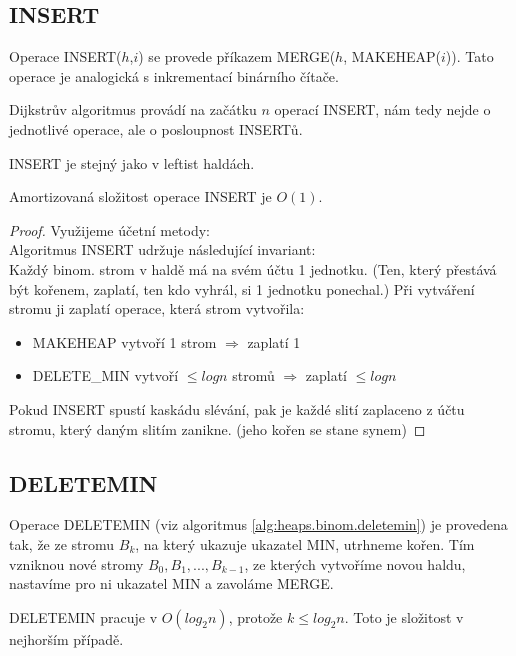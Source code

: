\subsection{INSERT}

Operace INSERT($h$,$i$) se provede příkazem MERGE($h$, MAKEHEAP($i$)).
Tato operace je analogická s inkrementací binárního čítače.

Dijkstrův algoritmus provádí na začátku $n$ operací INSERT, nám tedy nejde
o jednotlivé operace, ale o posloupnost INSERTů.

\begin{pozn}
INSERT je stejný jako v leftist haldách.
\end{pozn}

\begin{theorem}
Amortizovaná složitost operace INSERT je $O(1)$.
\end{theorem}

\begin{proof}
Využijeme účetní metody: \\
Algoritmus INSERT udržuje následující invariant: \\
Každý binom. strom v haldě má na svém účtu 1 jednotku. (Ten, který
přestává být kořenem, zaplatí, ten kdo vyhrál, si 1 jednotku ponechal.)
Při vytváření stromu ji zaplatí operace, která strom vytvořila: 
\begin{itemize}
  \item MAKEHEAP vytvoří 1 strom $\Rightarrow$ zaplatí 1
  \item DELETE\_MIN vytvoří $\leq log n$ stromů $\Rightarrow$ zaplatí
  	$\leq log n$
\end{itemize}
Pokud INSERT spustí kaskádu slévání, pak je každé slití zaplaceno z účtu
stromu, který daným slitím zanikne. (jeho kořen se stane synem)
\end{proof}


\subsection{DELETEMIN}

Operace DELETEMIN (viz algoritmus \ref{alg:heaps.binom.deletemin}) 
je provedena tak, že ze stromu $B_k$, na který ukazuje
ukazatel MIN, utrhneme kořen. Tím vzniknou nové stromy $B_0, B_1, ...,
B_{k-1}$, ze kterých vytvoříme novou haldu, nastavíme pro ni ukazatel MIN
a zavoláme MERGE.

DELETEMIN pracuje v $O(log_2 n)$, protože $k \leq log_2 n$. Toto je
složitost v nejhorším případě.


